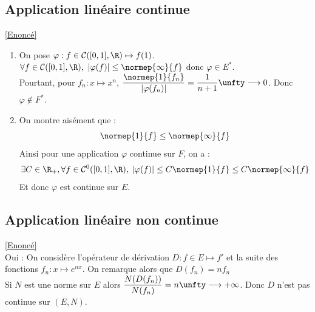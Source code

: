 \documentclass{book}
\begin{document}
	\subsection{Application linéaire continue }
	\label{sec:application-lineaire-continue}
	\textcolor{blue}{\hyperref[Application linéaire continue]{[Enoncé]}}\\
	\begin{enumerate}[leftmargin=*]
		\item On pose $\varphi:f\in \mathcal C([0,1],\R)\mapsto f(1)$.\\
		$\forall f\in \mathcal C([0,1],\R),\ |\varphi(f)|\leq \normep{\infty}{f}$ donc $\varphi\in E^*$.\\
		Pourtant, pour $f_n:x\mapsto x^n$, $\dfrac{\normep{1}{f_n}}{|\varphi(f_n)|}=\dfrac{1}{n+1}\unfty\longrightarrow0$. Donc $\varphi\notin F^*$.
		\item On montre aisément que : \[\normep{1}{f}\leq \normep{\infty}{f}\]
		Ainsi pour une application $\varphi$ continue sur $F$, on a : 
		\[\exists C\in\R_+,\forall f\in\mathcal{C}^0([0,1],\R), \; |\varphi(f)|\leq C\normep{1}{f}\leq C\normep{\infty}{f}\]
		Et donc $\varphi$ est continue sur $E$.
	\end{enumerate}
	
	\subsection{Application linéaire non continue }
	\label{sec:application-lineaire-non-continue}
	\textcolor{blue}{\hyperref[Application linéaire non continue]{[Enoncé]}}\\
	Oui : On considère l'opérateur de dérivation $D:f\in E\mapsto f'$ et la suite des fonctions $f_n:x\mapsto e^{nx}$. On remarque alors que $D(f_n)=nf_n$\\
	Si $N$ est une norme sur $E$ alors $\dfrac{N(D(f_n))}{N(f_n)}=n\unfty\longrightarrow+\infty$. Donc $D$ n'est pas continue sur $(E,N)$.
		
\end{document}
